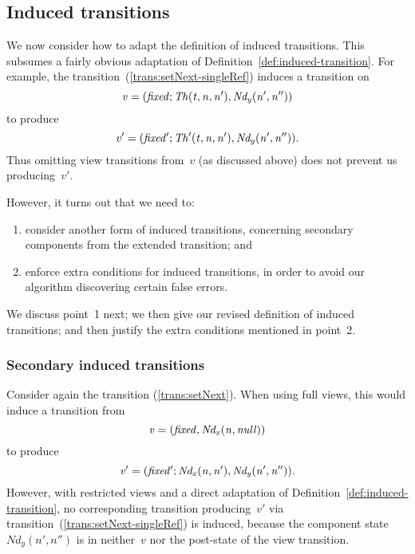 \subsection{Induced transitions}
\label{sec:singleRef-induced}

We now consider how to adapt the definition of induced transitions.  This
subsumes a fairly obvious adaptation of
Definition~\ref{def:induced-transition}.  For example, the
transition~(\ref{trans:setNext-singleRef}) induces a transition on
\[\mit
v = (fixed; Th(t, n, n'), Nd_y(n', n''))
\]
to produce
\[\mit
v' = (fixed'; Th'(t, n, n'), Nd_y(n', n'')). 
\]
Thus omitting view transitions from~$v$ (as discussed above) does not prevent
us producing~$v'$. 

However, it turns out that we need to:
\begin{enumerate}
\item consider another form of induced transitions, concerning secondary
  components from the extended transition; and

\item enforce extra conditions for induced transitions, in order to avoid our
  algorithm discovering certain false errors.
\end{enumerate}
%
We discuss point~1 next; we then give our revised definition of induced
transitions; and then justify the extra conditions mentioned in point~2.


\subsubsection{Secondary induced transitions}
\label{ssec:c2Refs}


Consider again the transition (\ref{trans:setNext}).  When using full views,
this would induce a transition from 
\[\mit
v = (fixed,  Nd_x(n, null))\]
to produce
\[\mit
v' = (fixed';  Nd_x(n, n'), Nd_y(n', n'')).
\]
However, with restricted views and a direct adaptation of
Definition~\ref{def:induced-transition}, no corresponding transition
producing~$v'$ via transition~(\ref{trans:setNext-singleRef}) is induced,
because the component state $Nd_y(n', n'')$ is in neither~$v$ nor the
post-state of the view transition.

